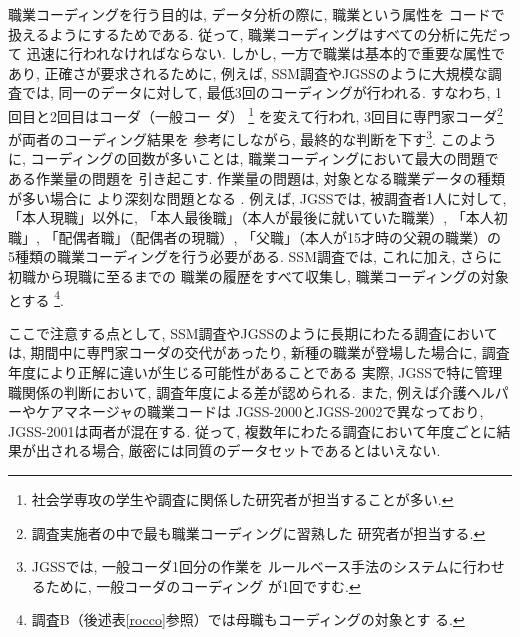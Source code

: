 \documentclass{nlp}
\begin{document}
職業コーディングを行う目的は, データ分析の際に, 職業という属性を
コードで扱えるようにするためである. 
従って, 職業コーディングはすべての分析に先だって
迅速に行われなければならない. 
しかし, 一方で職業は基本的で重要な属性であり, 
正確さが要求されるために, 
例えば, SSM調査やJGSSのように大規模な調査では, 同一のデータに対して, 
最低3回のコーディングが行われる. すなわち, 1回目と2回目はコーダ（一般コー
ダ）
\footnote{社会学専攻の学生や調査に関係した研究者が担当することが多い. }
を変えて行われ, 
3回目に専門家コーダ\footnote{調査実施者の中で最も職業コーディングに習熟した
研究者が担当する. }が両者のコーディング結果を
参考にしながら, 最終的な判断を下す\footnote{JGSSでは, 一般コーダ1回分の作業を
ルールベース手法のシステムに行わせるために, 一般コーダのコーディング
が1回ですむ\cite{Nishimura01}. }. 
このように, コーディングの回数が多いことは, 
職業コーディングにおいて最大の問題である作業量の問題を
引き起こす. 
作業量の問題は, 対象となる職業データの種類が多い場合に
より深刻な問題となる
. 
例えば, 
JGSSでは, 被調査者1人に対して, 「本人現職」以外に, 
「本人最後職」（本人が最後に就いていた職業）, 「本人初職」, 
「配偶者職」（配偶者の現職）, 「父職」（本人が15才時の父親の職業）の
5種類の職業コーディングを行う必要がある\cite{JGSS02,JGSS03}. 
SSM調査では, これに加え, さらに初職から現職に至るまでの
職業の履歴をすべて収集し, 職業コーディングの対象とする
\footnote{調査B（後述表\ref{rocco}参照）では母職もコーディングの対象とす
る. }. 

ここで注意する点として, SSM調査やJGSSのように長期にわたる調査においては, 
期間中に専門家コーダの交代があったり, 
新種の職業が登場した場合に, 
調査年度により正解に違いが生じる可能性があることである
実際, JGSSで特に管理職関係の判断において, 
調査年度による差が認められる. 
また, 例えば介護ヘルパーやケアマネージャの職業コードは
JGSS-2000とJGSS-2002で異なっており, 
JGSS-2001は両者が混在する. 
従って, 複数年にわたる調査において年度ごとに結果が出される場合, 
厳密には同質のデータセットであるとはいえない. 
\end{document}
